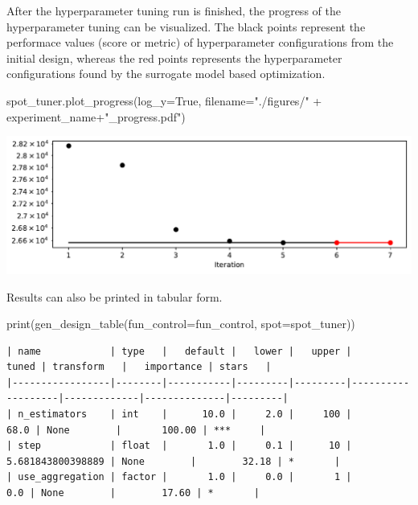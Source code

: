 \documentclass[
  letterpaper,
  DIV=11,
  numbers=noendperiod]{scrreprt}
\newenvironment{Shaded}{\begin{snugshade}}{\end{snugshade}}
\newcommand{\BuiltInTok}[1]{\textcolor[rgb]{0.00,0.23,0.31}{#1}}
\newcommand{\NormalTok}[1]{\textcolor[rgb]{0.00,0.23,0.31}{#1}}
\newcommand{\OperatorTok}[1]{\textcolor[rgb]{0.37,0.37,0.37}{#1}}
\newcommand{\StringTok}[1]{\textcolor[rgb]{0.13,0.47,0.30}{#1}}
\newcommand{\VariableTok}[1]{\textcolor[rgb]{0.07,0.07,0.07}{#1}}
\begin{document}
After the hyperparameter tuning run is finished, the progress of the
hyperparameter tuning can be visualized. The black points represent the
performace values (score or metric) of hyperparameter configurations
from the initial design, whereas the red points represents the
hyperparameter configurations found by the surrogate model based
optimization.

\begin{Shaded}
\begin{Highlighting}[]
\NormalTok{spot\_tuner.plot\_progress(log\_y}\OperatorTok{=}\VariableTok{True}\NormalTok{, filename}\OperatorTok{=}\StringTok{"./figures/"} \OperatorTok{+}\NormalTok{ experiment\_name}\OperatorTok{+}\StringTok{"\_progress.pdf"}\NormalTok{)}
\end{Highlighting}
\end{Shaded}

\includegraphics{025_spot_hpt_river_friedman_amfr_files/figure-pdf/cell-20-output-1.pdf}

Results can also be printed in tabular form.

\begin{Shaded}
\begin{Highlighting}[]
\BuiltInTok{print}\NormalTok{(gen\_design\_table(fun\_control}\OperatorTok{=}\NormalTok{fun\_control, spot}\OperatorTok{=}\NormalTok{spot\_tuner))}
\end{Highlighting}
\end{Shaded}

\begin{verbatim}
| name            | type   |   default |   lower |   upper |             tuned | transform   |   importance | stars   |
|-----------------|--------|-----------|---------|---------|-------------------|-------------|--------------|---------|
| n_estimators    | int    |      10.0 |     2.0 |     100 |              68.0 | None        |       100.00 | ***     |
| step            | float  |       1.0 |     0.1 |      10 | 5.681843800398889 | None        |        32.18 | *       |
| use_aggregation | factor |       1.0 |     0.0 |       1 |               0.0 | None        |        17.60 | *       |
\end{verbatim}
\end{document}
